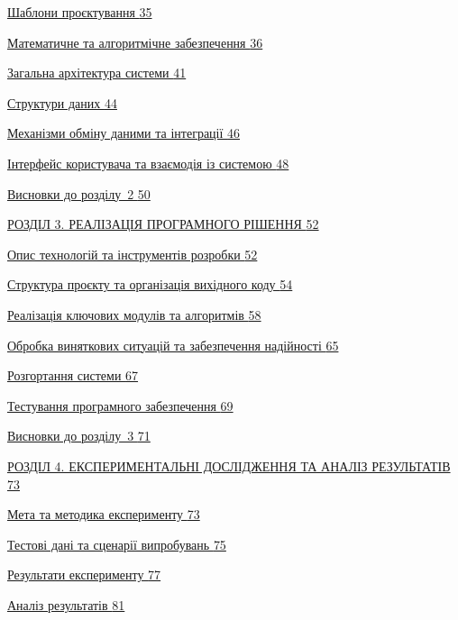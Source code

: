 \hyperref[_Toc228121448]{Шаблони проєктування
\hyperref[_Toc228121448]{35}}

\hyperref[_Toc228121450]{Математичне та алгоритмічне забезпечення
\hyperref[_Toc228121450]{36}}

\hyperref[_Toc228121457]{Загальна архітектура системи
\hyperref[_Toc228121457]{41}}

\hyperref[_Toc228121462]{Структури даних \hyperref[_Toc228121462]{44}}

\hyperref[_Toc228121469]{Механізми обміну даними та інтеграції
\hyperref[_Toc228121469]{46}}

\hyperref[_Toc228121473]{Інтерфейс користувача та взаємодія із системою
\hyperref[_Toc228121473]{48}}

\hyperref[_Toc228121478]{Висновки до розділу~2
\hyperref[_Toc228121478]{50}}

\hyperref[_Toc229681122]{РОЗДІЛ 3. РЕАЛІЗАЦІЯ ПРОГРАМНОГО РІШЕННЯ
\hyperref[_Toc229681122]{52}}

\hyperref[_Toc229681123]{Опис технологій та інструментів розробки
\hyperref[_Toc229681123]{52}}

\hyperref[_Toc229681128]{Структура проєкту та організація вихідного коду
\hyperref[_Toc229681128]{54}}

\hyperref[_Toc229681134]{Реалізація ключових модулів та алгоритмів
\hyperref[_Toc229681134]{58}}

\hyperref[_Toc229681146]{Обробка виняткових ситуацій та забезпечення
надійності \hyperref[_Toc229681146]{65}}

\hyperref[_Toc229681152]{Розгортання системи
\hyperref[_Toc229681152]{67}}

\hyperref[_Toc229681157]{Тестування програмного забезпечення
\hyperref[_Toc229681157]{69}}

\hyperref[_Toc229681163]{Висновки до розділу~3
\hyperref[_Toc229681163]{71}}

\hyperref[_Toc229681164]{РОЗДІЛ 4. ЕКСПЕРИМЕНТАЛЬНІ ДОСЛІДЖЕННЯ ТА
АНАЛІЗ РЕЗУЛЬТАТІВ \hyperref[_Toc229681164]{73}}

\hyperref[_Toc229681165]{Мета та методика експерименту
\hyperref[_Toc229681165]{73}}

\hyperref[_Toc229681166]{Тестові дані та сценарії випробувань
\hyperref[_Toc229681166]{75}}

\hyperref[_Toc229681167]{Результати експерименту
\hyperref[_Toc229681167]{77}}

\hyperref[_Toc229681174]{Аналіз результатів
\hyperref[_Toc229681174]{81}}

